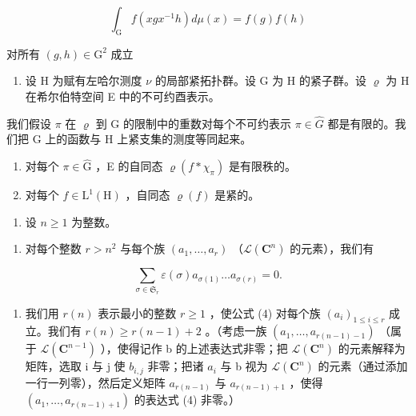 \[
\int_ {\mathrm{G}} f (x g x ^ {- 1} h) d \mu (x) = f (g) f (h)
\]

对所有 \((g,h)\in \mathrm{G}^2\) 成立

\begin{enumerate}
\def\labelenumi{\arabic{enumi})}
\setcounter{enumi}{19}
\tightlist
\item
  设 H 为赋有左哈尔测度 \(\nu\) 的局部紧拓扑群。设 G 为 H 的紧子群。设 \(\varrho\) 为 H 在希尔伯特空间 E 中的不可约酉表示。
\end{enumerate}

我们假设 \(\pi\) 在 \(\varrho\) 到 G 的限制中的重数对每个不可约表示 \(\pi \in \widehat{G}\) 都是有限的。我们把 G 上的函数与 H 上紧支集的测度等同起来。

\begin{enumerate}
\def\labelenumi{\alph{enumi})}
\item
  对每个 \(\pi \in \widehat{\mathrm{G}}\) ，E 的自同态 \(\varrho(f * \chi_{\pi})\) 是有限秩的。
\item
  对每个 \(f \in \mathrm{L}^{1}(\mathrm{H})\) ，自同态 \(\varrho(f)\) 是紧的。
\end{enumerate}

\begin{enumerate}
\def\labelenumi{\arabic{enumi})}
\setcounter{enumi}{20}
\tightlist
\item
  设 \(n \geqslant 1\) 为整数。
\end{enumerate}

\begin{enumerate}
\def\labelenumi{\alph{enumi})}
\tightlist
\item
  对每个整数 \(r > n^{2}\) 与每个族 \((a_{1}, \ldots, a_{r})\) （\(\mathcal{L}(\mathbf{C}^{n})\) 的元素），我们有
\end{enumerate}

\[
\sum_ {\sigma \in \mathfrak {S} _ {r}} \varepsilon (\sigma) a _ {\sigma (1)} \dots a _ {\sigma (r)} = 0.\tag{4}
\]

\begin{enumerate}
\def\labelenumi{\alph{enumi})}
\setcounter{enumi}{1}
\tightlist
\item
  我们用 \(r(n)\) 表示最小的整数 \(r \geqslant 1\) ，使公式 (4) 对每个族 \((a_i)_{1 \leqslant i \leqslant r}\) 成立。我们有 \(r(n) \geqslant r(n-1) + 2\) 。（考虑一族 \((a_1, \ldots, a_{r(n-1)-1})\) （属于 \(\mathcal{L}(\mathbf{C}^{n-1})\) ），使得记作 b 的上述表达式非零；把 \(\mathcal{L}(\mathbf{C}^n)\) 的元素解释为矩阵，选取 i 与 j 使 \(b_{i,j}\) 非零；把诸 \(a_i\) 与 b 视为 \(\mathcal{L}(\mathbf{C}^n)\) 的元素（通过添加一行一列零），然后定义矩阵 \(a_{r(n-1)}\) 与 \(a_{r(n-1)+1}\) ，使得 \((a_1, \ldots, a_{r(n-1)+1})\) 的表达式 (4) 非零。）
\end{enumerate}

